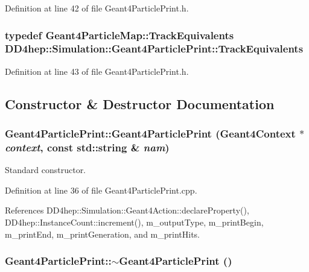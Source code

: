 Definition at line 42 of file Geant4ParticlePrint.h.\hypertarget{class_d_d4hep_1_1_simulation_1_1_geant4_particle_print_af3d655fbfb9d0a270a3df703205c4b5b}{
\subsubsection[{TrackEquivalents}]{\setlength{\rightskip}{0pt plus 5cm}typedef {\bf Geant4ParticleMap::TrackEquivalents} {\bf DD4hep::Simulation::Geant4ParticlePrint::TrackEquivalents}}}
\label{class_d_d4hep_1_1_simulation_1_1_geant4_particle_print_af3d655fbfb9d0a270a3df703205c4b5b}


Definition at line 43 of file Geant4ParticlePrint.h.

\subsection{Constructor \& Destructor Documentation}
\hypertarget{class_d_d4hep_1_1_simulation_1_1_geant4_particle_print_a58c9b621de94baca62700ae958afc596}{
\subsubsection[{Geant4ParticlePrint}]{\setlength{\rightskip}{0pt plus 5cm}Geant4ParticlePrint::Geant4ParticlePrint ({\bf Geant4Context} $\ast$ {\em context}, \/  const std::string \& {\em nam})}}
\label{class_d_d4hep_1_1_simulation_1_1_geant4_particle_print_a58c9b621de94baca62700ae958afc596}


Standard constructor. 

Definition at line 36 of file Geant4ParticlePrint.cpp.

References DD4hep::Simulation::Geant4Action::declareProperty(), DD4hep::InstanceCount::increment(), m\_\-outputType, m\_\-printBegin, m\_\-printEnd, m\_\-printGeneration, and m\_\-printHits.\hypertarget{class_d_d4hep_1_1_simulation_1_1_geant4_particle_print_a6a9afd3df558e060f8bb32db26de8433}{
\subsubsection[{$\sim$Geant4ParticlePrint}]{\setlength{\rightskip}{0pt plus 5cm}Geant4ParticlePrint::$\sim$Geant4ParticlePrint ()}}
\label{class_d_d4hep_1_1_simulation_1_1_geant4_particle_print_a6a9afd3df558e060f8bb32db26de8433}


